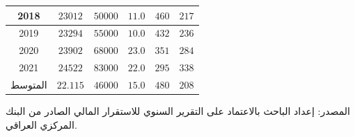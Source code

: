 \documentclass[10pt,a4paper]{report}
\begin{document}
\begin{doublespacing}
\begin{table}[H]
{\begin{tabular}{|c|c|c|c|c|c|}
			2018           & \( 23012 \)                                                                               & \( 50000 \)                                                              & \( 11.0 \)             & \( 460 \)                                                                          & \( 217 \)                                                                          \\ \hline
			2019           & \( 23294 \)                                                                               & \( 55000 \)                                                              & \( 10.0 \)             & \( 432 \)                                                                          & \( 236 \)                                                                          \\ \hline
			2020           & \( 23902 \)                                                                               & \( 68000 \)                                                              & \( 23.0 \)             & \( 351 \)                                                                          & \( 284 \)                                                                          \\ \hline
			2021           & \( 24522 \)                                                                               & \( 83000 \)                                                              & \( 22.0 \)             & \( 295 \)                                                                          & \( 338 \)                                                                          \\ \hline
			المتوسط        & \( 22.115 \)                                                                              & \( 46000 \)                                                              & \( 15.0 \)             & \( 480 \)                                                                          & \( 208 \)                                                                          \\ \hline
		\end{tabular}
		}
	\end{table}
المصدر: إعداد الباحث بالاعتماد على التقرير السنوي للاستقرار المالي الصادر من البنك المركزي العراقي.


\end{doublespacing}
\end{document}
